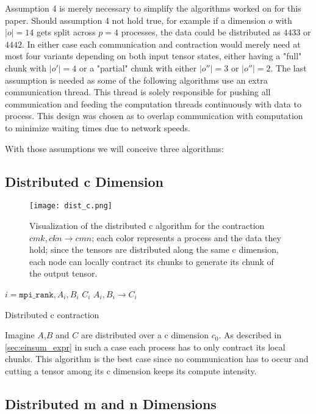 Assumption 4 is merely necessary to simplify the algorithms worked on for this paper.
Should assumption 4 not hold true, for example if a dimension $o$ with $|o|=14$ gets split across $p=4$ processes, the data could be distributed as $4 4 3 3$ or $4 4 4 2$.
In either case each communication and contraction would merely need at most four variants depending on both input tensor states, either having a "full" chunk with $|o'|=4$ or a "partial" chunk with either $|o''|=3$ or $|o''|=2$.
The last assumption is needed as some of the following algorithms use an extra communication thread.
This thread is solely responsible for pushing all communication and feeding the computation threads continuously with data to process.
This design was chosen as to overlap communication with computation to minimize waiting times due to network speeds.

With those assumptions we will conceive three algorithms:

\subsection{Distributed c Dimension}

\begin{figure}[ht]
    \centering\texttt{[image: dist\_c.png]} 
    \caption{Visualization of the distributed c algorithm for the contraction $cmk,ckn \rightarrow cmn$; 
    each color represents a process and the data they hold; 
    since the tensors are distributed along the same c dimension, each node can locally contract its chunks to generate its chunk of the output tensor.}
    \label{fig:c_algo}
    \end{figure}

\begin{algorithm}[ht]
    \begin{algorithmic}
    \Require $i = \texttt{mpi\_rank}, A_i, B_i$
    \Ensure $C_i$
    \State $A_i, B_i \rightarrow C_i$
\end{algorithmic}
\caption{Distributed c contraction}
\label{alg:c_pseudocode}
\end{algorithm}

Imagine $A$,$B$ and $C$ are distributed over a c dimension $c_0$.
As described in \ref{sec:einsum_expr} in such a case each process has to only contract its local chunks.
This algorithm is the best case since no communication has to occur and cutting a tensor among its c dimension keeps its compute intensity.

\subsection{Distributed m and n Dimensions}

